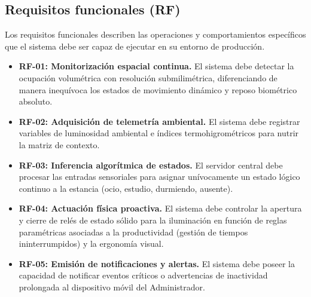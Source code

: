 \subsection{Requisitos funcionales (RF)}
Los requisitos funcionales describen las operaciones y comportamientos específicos que el sistema debe ser capaz de ejecutar en su entorno de producción.
\begin{itemize}
    \item \textbf{RF-01: Monitorización espacial continua.} El sistema debe detectar la ocupación volumétrica con resolución submilimétrica, diferenciando de manera inequívoca los estados de movimiento dinámico y reposo biométrico absoluto.
    \item \textbf{RF-02: Adquisición de telemetría ambiental.} El sistema debe registrar variables de luminosidad ambiental e índices termohigrométricos para nutrir la matriz de contexto.
    \item \textbf{RF-03: Inferencia algorítmica de estados.} El servidor central debe procesar las entradas sensoriales para asignar unívocamente un estado lógico continuo a la estancia (ocio, estudio, durmiendo, ausente).
    \item \textbf{RF-04: Actuación física proactiva.} El sistema debe controlar la apertura y cierre de relés de estado sólido para la iluminación en función de reglas paramétricas asociadas a la productividad (gestión de tiempos ininterrumpidos) y la ergonomía visual.
    \item \textbf{RF-05: Emisión de notificaciones y alertas.} El sistema debe poseer la capacidad de notificar eventos críticos o advertencias de inactividad prolongada al dispositivo móvil del Administrador.
\end{itemize}

